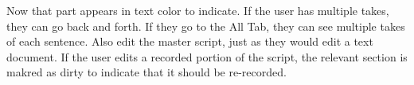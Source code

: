 Now that part appears in text color to indicate. If the user has multiple takes, they can go back and forth. If they go to the All Tab, they can see multiple takes of each sentence.
Also edit the master script, just as they would edit a text document. If the user edits a recorded portion of the script, the relevant section is makred as dirty to indicate that it should be re-recorded.

